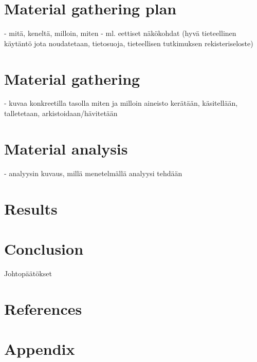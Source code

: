 \documentclass[utf8,english]{gradu3}
\begin{document}
\section{Material gathering plan}


- mitä, keneltä, milloin, miten
- ml. eettiset näkökohdat (hyvä tieteellinen käytäntö jota noudatetaan, tietosuoja, tieteellisen tutkimuksen rekisteriseloste)
\section{Material gathering}


- kuvaa konkreetilla tasolla miten ja milloin aineisto kerätään, käsitellään, talletetaan, arkistoidaan/hävitetään
\section{Material analysis}


- analyysin kuvaus, millä menetelmällä analyysi tehdään
\section{Results}


\section{Conclusion}

Johtopäätökset
\section{References}


\section{Appendix}
\end{document}
